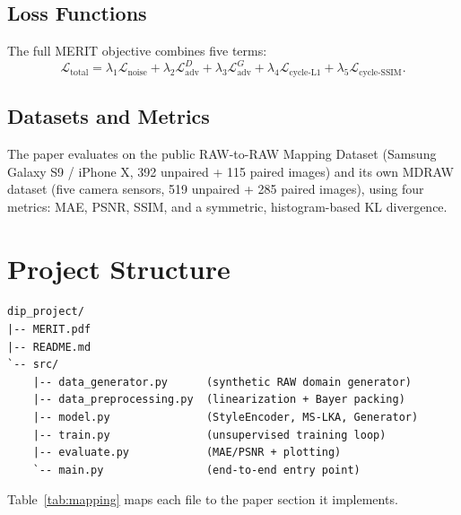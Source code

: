 \documentclass[11pt]{article}
\begin{document}
\subsection{Loss Functions}
The full MERIT objective combines five terms:
\begin{equation}
    \mathcal{L}_{\text{total}} = \lambda_1 \mathcal{L}_{\text{noise}}
        + \lambda_2 \mathcal{L}_{\text{adv}}^D
        + \lambda_3 \mathcal{L}_{\text{adv}}^G
        + \lambda_4 \mathcal{L}_{\text{cycle-L1}}
        + \lambda_5 \mathcal{L}_{\text{cycle-SSIM}}.
\end{equation}

\subsection{Datasets and Metrics}
The paper evaluates on the public RAW-to-RAW Mapping Dataset (Samsung
Galaxy S9 / iPhone X, 392 unpaired + 115 paired images) \cite{afifi2021}
and its own MDRAW dataset (five camera sensors, 519 unpaired + 285
paired images), using four metrics: MAE, PSNR, SSIM, and a symmetric,
histogram-based KL divergence.

\section{Project Structure}

\begin{verbatim}
dip_project/
|-- MERIT.pdf
|-- README.md
`-- src/
    |-- data_generator.py      (synthetic RAW domain generator)
    |-- data_preprocessing.py  (linearization + Bayer packing)
    |-- model.py               (StyleEncoder, MS-LKA, Generator)
    |-- train.py               (unsupervised training loop)
    |-- evaluate.py            (MAE/PSNR + plotting)
    `-- main.py                (end-to-end entry point)
\end{verbatim}

Table~\ref{tab:mapping} maps each file to the paper section it
implements.
\end{document}
